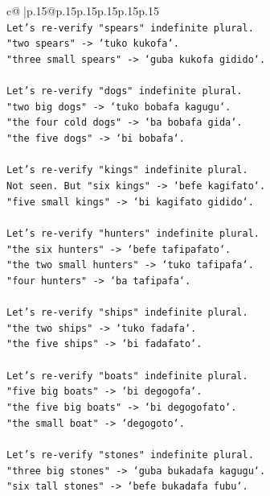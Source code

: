 \documentclass{article}
\begin{document}
{\begin{supertabular}{c@{$\;$}|p{.15\linewidth}@{}p{.15\linewidth}p{.15\linewidth}p{.15\linewidth}p{.15\linewidth}p{.15\linewidth}}
{{{\\ 
\texttt{Let's re{-}verify "spears" indefinite plural.} \\
\texttt{"two spears" {-}> `tuko kukofa`.} \\
\texttt{"three small spears" {-}> `guba kukofa gidido`.} \\
\\ 
\texttt{Let's re{-}verify "dogs" indefinite plural.} \\
\texttt{"two big dogs" {-}> `tuko bobafa kagugu`.} \\
\texttt{"the four cold dogs" {-}> `ba bobafa gida`.} \\
\texttt{"the five dogs" {-}> `bi bobafa`.} \\
\\ 
\texttt{Let's re{-}verify "kings" indefinite plural.} \\
\texttt{Not seen. But "six kings" {-}> `befe kagifato`.} \\
\texttt{"five small kings" {-}> `bi kagifato gidido`.} \\
\\ 
\texttt{Let's re{-}verify "hunters" indefinite plural.} \\
\texttt{"the six hunters" {-}> `befe tafipafato`.} \\
\texttt{"the two small hunters" {-}> `tuko tafipafa`.} \\
\texttt{"four hunters" {-}> `ba tafipafa`.} \\
\\ 
\texttt{Let's re{-}verify "ships" indefinite plural.} \\
\texttt{"the two ships" {-}> `tuko fadafa`.} \\
\texttt{"the five ships" {-}> `bi fadafato`.} \\
\\ 
\texttt{Let's re{-}verify "boats" indefinite plural.} \\
\texttt{"five big boats" {-}> `bi degogofa`.} \\
\texttt{"the five big boats" {-}> `bi degogofato`.} \\
\texttt{"the small boat" {-}> `degogoto`.} \\
\\ 
\texttt{Let's re{-}verify "stones" indefinite plural.} \\
\texttt{"three big stones" {-}> `guba bukadafa kagugu`.} \\
\texttt{"six tall stones" {-}> `befe bukadafa fubu`.} \\
\\ 
}}}
\end{supertabular}}
\end{document}
